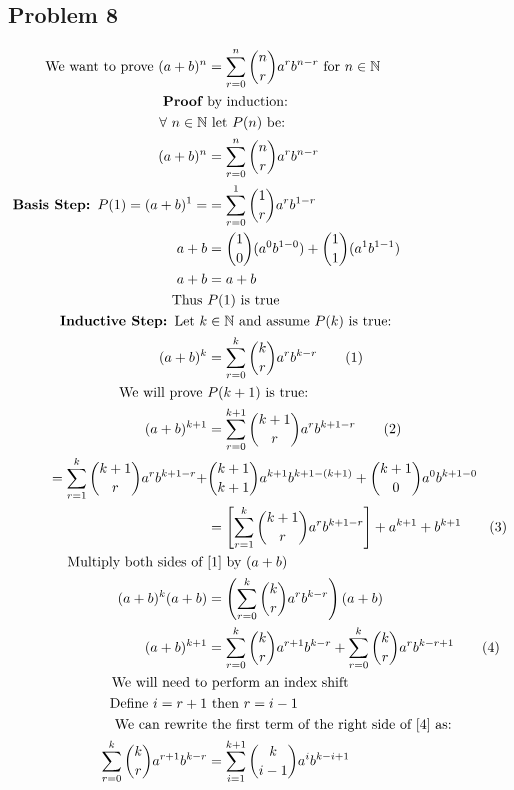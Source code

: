 \documentclass{article}
\begin{document}
\begin{flushleft}
\section*{Problem 8}
\allowdisplaybreaks
\begin{align*}
\text{We want to prove } (a+b)^n&=\sum \limits_{r=0}^{n}{n \choose r}a^r b^{n-r} \text{ for } n \in \mathbb{N}\\
\textbf{Proof }&\text{by induction:}\\
\forall \ n \in \mathbb{N} &\text{ let } P(n) \text{ be:}\\
(a+b)^n&=\sum \limits_{r=0}^{n}{n \choose r}a^r b^{n-r}\\
\textbf{Basis Step: }P(1)=(a+b)^1=&=\sum \limits_{r=0}^{1}{1 \choose r}a^r b^{1-r}\\
a+b&={1\choose 0}(a^0b^{1-0})+{1\choose 1}(a^1b^{1-1})\\
a+b&=a+b\\
\text{Thus } &P(1) \text{ is true}\\
\textbf{Inductive Step: } \text{Let } k&\in \mathbb{N} \text{ and assume }
P(k) \text{ is true:}\\
(a+b)^k&=\sum \limits_{r=0}^{k}{k \choose r}a^r b^{k-r} \label{1}\tag{1}\\
\text{We will prove } &P(k+1) \text{ is true:}\\
(a+b)^{k+1}&=\sum \limits_{r=0}^{k+1}{k+1 \choose r}a^r b^{k+1-r}\label{2}\tag{2}\\
=\sum \limits_{r=1}^{k}{k+1 \choose r}a^r b^{k+1-r}+&{k+1 \choose k+1}a^{k+1}b^{k+1-(k+1)}+{k+1\choose 0} a^0b^{k+1-0}\\
&=\left[\sum \limits_{r=1}^{k}{k+1 \choose r}a^r b^{k+1-r}\right]+a^{k+1}+b^{k+1} \label{3}\tag{3}\\
\text{Multiply both sides of }& \eqref{1} \text{ by } (a+b)\\
(a+b)^k(a+b)&=\left(\sum \limits_{r=0}^{k}{k \choose r}a^r b^{k-r}\right)(a+b)\\
(a+b)^{k+1}&=\sum \limits_{r=0}^{k}{k \choose r}a^{r+1} b^{k-r}+\sum \limits_{r=0}^{k}{k \choose r}a^{r} b^{k-r+1} \label{4}\tag{4}\\
\text{We will need to}& \text{ perform an index shift}\\
\text{Define } i=r+1 &\text{ then } r=i-1\\
\text{ We can rewrite}&\text{ the first term of the right side of } \eqref{4} \text{ as:}\\
\sum \limits_{r=0}^{k}{k \choose r}a^{r+1} b^{k-r}&=\sum \limits_{i=1}^{k+1}{k\choose i-1}a^ib^{k-i+1}\\

\end{align*}
\end{flushleft}
\end{document}
